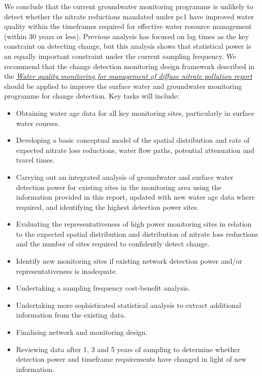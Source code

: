 We conclude that the current groundwater monitoring programme is unlikely to detect whether the nitrate reductions mandated under \gls{pc1} have improved water quality within the timeframes required for effective water resource management (within 30 years or less).
Previous analysis has focused on lag times as the key constraint on detecting change, but this analysis shows that statistical power is an equally important constraint under the current sampling frequency.
We recommend that the change detection monitoring design framework described in the \textit{\href{https://github.com/Komanawa-Solutions-Ltd/gw_detect_power/blob/main/supporting_documents/Water_quality_monitoring_for_management_of_diffuse_nitrate_pollution_Final.pdf}{Water quality monitoring for management of diffuse nitrate pollution report}} \citep{olw_guidance}
should be applied to improve the surface water and groundwater monitoring programme for change detection. Key tasks will include:
\begin{itemize}
    \item Obtaining water age data for all key monitoring sites, particularly in surface water courses.
    \item Developing a basic conceptual model of the spatial distribution and rate of expected nitrate loss reductions, water flow paths, potential attenuation and travel times.
    \item Carrying out an integrated analysis of groundwater and surface water detection power for existing sites in the monitoring area using the information provided in this report, updated with new water age data where required, and identifying the highest detection power sites.
    \item Evaluating the representativeness of high power monitoring sites in relation to the expected spatial distribution and distribution of nitrate loss reductions and the number of sites required to confidently detect change.
    \item Identify new monitoring sites if existing network detection power and/or representativeness is inadequate.
    \item Undertaking a sampling frequency cost-benefit analysis.
    \item Undertaking more sophisticated statistical analysis to extract additional information from the existing data.
    \item Finalising network and monitoring design.
    \item Reviewing data after 1, 3 and 5 years of sampling to determine whether detection power and timeframe requirements have changed in light of new information.
\end{itemize}
